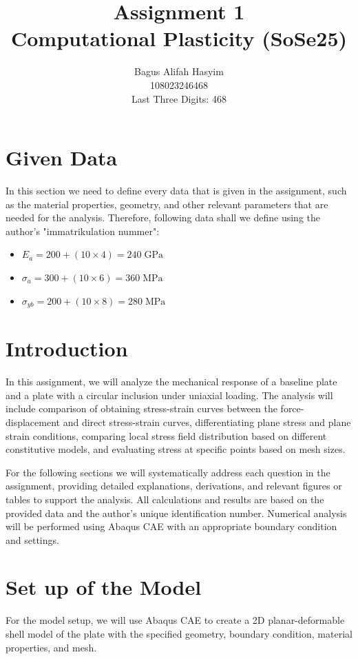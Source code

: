 \documentclass[12pt]{article}
\title{Assignment 1 \\ \large Computational Plasticity (SoSe25)}
\author{Bagus Alifah Hasyim \\ 108023246468 \\ Last Three Digits: 468}
\date{}
\begin{document}
\maketitle

\section*{Given Data}
\hspace*{2em}In this section we need to define every data that is given in the assignment, such as the material properties, geometry, 
and other relevant parameters that are needed for the analysis. Therefore, following data shall we define using the author's "immatrikulation nummer":

\begin{itemize}
    \item $E_a = 200 + (10 \times 4) = 240 \;\text{GPa}$  
    \item $\sigma_a = 300 + (10 \times 6) = 360 \;\text{MPa}$
    \item $\sigma_{yb} = 200 + (10 \times 8) = 280 \;\text{MPa}$
\end{itemize}

\section{Introduction}
\hspace*{2em}In this assignment, we will analyze the mechanical response of a baseline plate
and a plate with a circular inclusion under uniaxial loading. 
The analysis will include comparison of obtaining stress-strain curves between the force-displacement and
direct stress-strain curves, differentiating plane stress and plane strain conditions, comparing 
local stress field distribution based on different constitutive models, and evaluating stress at specific points based on mesh sizes.

\hspace*{2em}For the following sections we will systematically address each question in the assignment, 
providing detailed explanations, derivations, and relevant figures or tables to 
support the analysis. 
All calculations and results are based on the provided data and the author's unique 
identification number. Numerical analysis will be performed using Abaqus CAE with an appropriate
boundary condition and settings. 

\section{Set up of the Model}
\hspace*{2em}For the model setup, we will use Abaqus CAE to create a 2D planar-deformable shell model of the plate with the specified geometry, boundary condition, material properties, and mesh.  
\end{document}
